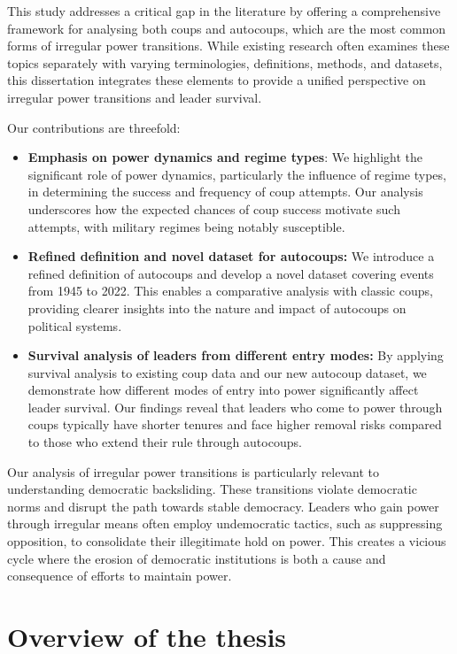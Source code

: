 \documentclass[
  12pt,
]{report}
\begin{document}
This study addresses a critical gap in the literature by offering a
comprehensive framework for analysing both coups and autocoups, which
are the most common forms of irregular power transitions. While existing
research often examines these topics separately with varying
terminologies, definitions, methods, and datasets, this dissertation
integrates these elements to provide a unified perspective on irregular
power transitions and leader survival.

Our contributions are threefold:

\begin{itemize}
\item
  \textbf{Emphasis on power dynamics and regime types}: We highlight the
  significant role of power dynamics, particularly the influence of
  regime types, in determining the success and frequency of coup
  attempts. Our analysis underscores how the expected chances of coup
  success motivate such attempts, with military regimes being notably
  susceptible.
\item
  \textbf{Refined definition and novel dataset for autocoups:} We
  introduce a refined definition of autocoups and develop a novel
  dataset covering events from 1945 to 2022. This enables a comparative
  analysis with classic coups, providing clearer insights into the
  nature and impact of autocoups on political systems.
\item
  \textbf{Survival analysis of leaders from different entry modes:} By
  applying survival analysis to existing coup data and our new autocoup
  dataset, we demonstrate how different modes of entry into power
  significantly affect leader survival. Our findings reveal that leaders
  who come to power through coups typically have shorter tenures and
  face higher removal risks compared to those who extend their rule
  through autocoups.
\end{itemize}

Our analysis of irregular power transitions is particularly relevant to
understanding democratic backsliding. These transitions violate
democratic norms and disrupt the path towards stable democracy. Leaders
who gain power through irregular means often employ undemocratic
tactics, such as suppressing opposition, to consolidate their
illegitimate hold on power. This creates a vicious cycle where the
erosion of democratic institutions is both a cause and consequence of
efforts to maintain power.

\section{Overview of the thesis}\label{overview-of-the-thesis}
\end{document}
